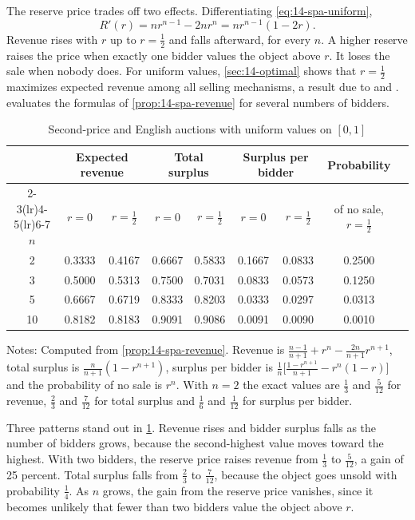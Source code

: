 The reserve price trades off two effects. Differentiating \eqref{eq:14-spa-uniform},
\[
R'(r)=nr^{n-1}-2nr^n=nr^{n-1}(1-2r).
\]
Revenue rises with $r$ up to $r=\frac{1}{2}$ and falls afterward, for every $n$. A higher reserve raises the
price when exactly one bidder values the object above $r$. It loses the sale when nobody does. For uniform
values, \cref{sec:14-optimal} shows that $r=\frac{1}{2}$ maximizes expected revenue among all selling
mechanisms, a result due to \citet{Myerson1981} and \citet{RileySamuelson1981}. 
evaluates the formulas of \cref{prop:14-spa-revenue} for several numbers of bidders.

\begin{table}[htbp]
\centering
\caption{Second-price and English auctions with uniform values on $[0,1]$}\label{tab:14-spa-uniform}
\small
\begin{tabular}{@{}ccccccccc@{}}
\toprule
 & \multicolumn{2}{c}{Expected revenue} & \multicolumn{2}{c}{Total surplus} &
 \multicolumn{2}{c}{Surplus per bidder} & Probability \\
\cmidrule(lr){2-3}\cmidrule(lr){4-5}\cmidrule(lr){6-7}
$n$ & $r=0$ & $r=\frac{1}{2}$ & $r=0$ & $r=\frac{1}{2}$ & $r=0$ & $r=\frac{1}{2}$ & of no sale, $r=\frac{1}{2}$ \\
\midrule
2  & 0.3333 & 0.4167 & 0.6667 & 0.5833 & 0.1667 & 0.0833 & 0.2500 \\
3  & 0.5000 & 0.5313 & 0.7500 & 0.7031 & 0.0833 & 0.0573 & 0.1250 \\
5  & 0.6667 & 0.6719 & 0.8333 & 0.8203 & 0.0333 & 0.0297 & 0.0313 \\
10 & 0.8182 & 0.8183 & 0.9091 & 0.9086 & 0.0091 & 0.0090 & 0.0010 \\
\bottomrule
\end{tabular}

\smallskip
\begin{minipage}{0.92\textwidth}
\footnotesize Notes: Computed from \cref{prop:14-spa-revenue}. Revenue is
$\frac{n-1}{n+1}+r^n-\frac{2n}{n+1}r^{n+1}$, total surplus is $\frac{n}{n+1}(1-r^{n+1})$, surplus per bidder is
$\frac{1}{n}\bigl[\frac{1-r^{n+1}}{n+1}-r^n(1-r)\bigr]$ and the probability of no sale is $r^n$. With $n=2$
the exact values are $\frac{1}{3}$ and $\frac{5}{12}$ for revenue, $\frac{2}{3}$ and $\frac{7}{12}$ for
total surplus and $\frac{1}{6}$ and $\frac{1}{12}$ for surplus per bidder.
\end{minipage}
\end{table}

Three patterns stand out in \cref{tab:14-spa-uniform}. Revenue rises and bidder surplus falls as the number
of bidders grows, because the second-highest value moves toward the highest. With two bidders, the reserve
price raises revenue from $\frac{1}{3}$ to $\frac{5}{12}$, a gain of 25 percent. Total surplus falls from
$\frac{2}{3}$ to $\frac{7}{12}$, because the object goes unsold with probability $\frac{1}{4}$. As $n$ grows,
the gain from the reserve price vanishes, since it becomes unlikely that fewer than two bidders value the
object above $r$.


